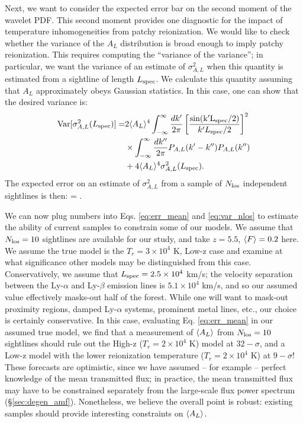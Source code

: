 Next, we want to consider the expected error bar on the second moment of the wavelet PDF. This second moment provides one
diagnostic for the impact of temperature inhomogeneities from patchy reionization. We would like to check whether
the variance of the $A_L$ distribution is broad enough to imply patchy reionization. This requires computing the
``variance of the variance''; in particular, we want the variance of an estimate of $\sigma^2_{A,L}$ when this
quantity is estimated from a sightline of length $L_{\rm spec}$. We calculate this quantity assuming that $A_L$ approximately
obeys Gaussian statistics. In this case, one can show that the desired variance is:
\begin{align}
{\rm Var}[\sigma^2_{A,L}(L_{\rm spec})] =& 2 \langle A_L \rangle^4 \int_{-\infty}^{\infty} \frac{dk^\prime}{2 \pi} \left[\frac{\rm{sin}(k^\prime L_{\rm spec}/2)}{k^\prime L_{\rm spec}/2} \right]^2 \nonumber \\
& \times \int_{-\infty}^{\infty} \frac{dk^{\prime \prime}}{2 \pi} P_{A,L}(k^\prime - k^{\prime \prime}) P_{A,L}(k^{\prime \prime}) \nonumber \\
& + 4 \langle A_L \rangle^4 \sigma^2_{A,L}(L_{\rm spec}).
\label{eq:var_al}
\end{align}
The expected error on an estimate of $\sigma^2_{A,L}$ from a sample of $N_{\rm los}$ independent sightlines is then:
\beqa
{} =  .
\label{eq:var_nlos}
\eeqa

We can now plug numbers into Eqs. \ref{eq:err_mean} and \ref{eq:var_nlos} to estimate the ability of current samples to
constrain some of our models. We assume that $N_{\rm los} = 10$ sightlines are available for our study, and take $z=5.5$, $\langle F \rangle=0.2$ 
here. We assume the true model is the $T_r = 3 \times 10^4$ K, Low-z case and examine at what significance other models
may be distinguished from this case. Conservatively, we assume that $L_{\rm spec} = 2.5 \times 10^4$ km/s; the velocity separation
between the Ly-$\alpha$ and Ly-$\beta$ emission lines is $5.1 \times 10^4$ km/s, and so our assumed value effectively 
masks-out half of the forest. While one will want to mask-out proximity regions, damped Ly-$\alpha$ systems, prominent metal lines, etc., our choice is certainly conservative. In this case, evaluating Eq. \ref{eq:err_mean} in our assumed true model, we find that a measurement
of $\langle A_L \rangle$ from $N_{\rm los} = 10$ sightlines should rule out the High-z ($T_r = 2 \times 10^4$ K) model at $32-\sigma$, and
a Low-z model with the lower reionization temperature ($T_r = 2 \times 10^4$ K) at $9-\sigma$! These forecasts are  
optimistic, since
we have assumed -- for example -- perfect knowledge of the mean transmitted flux; in practice, the mean transmitted flux 
may have to be constrained separately from the
large-scale flux power spectrum (\S \ref{sec:degen_amf}). Nonetheless, we believe the overall point is robust: existing samples should
provide interesting constraints on $\langle A_L \rangle$.

